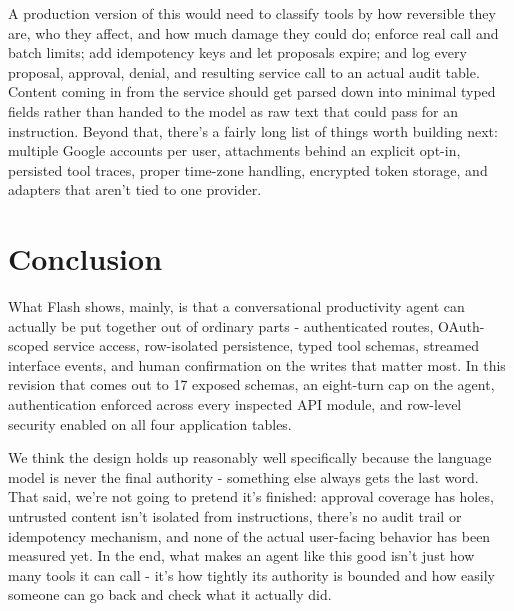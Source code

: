 \documentclass[conference]{IEEEtran}
\begin{document}
A production version of this would need to classify tools by how reversible they are, who they affect, and how much damage they could do; enforce real call and batch limits; add idempotency keys and let proposals expire; and log every proposal, approval, denial, and resulting service call to an actual audit table. Content coming in from the service should get parsed down into minimal typed fields rather than handed to the model as raw text that could pass for an instruction. Beyond that, there's a fairly long list of things worth building next: multiple Google accounts per user, attachments behind an explicit opt-in, persisted tool traces, proper time-zone handling, encrypted token storage, and adapters that aren't tied to one provider.

\balance
\section{Conclusion}

What Flash shows, mainly, is that a conversational productivity agent can actually be put together out of ordinary parts - authenticated routes, OAuth-scoped service access, row-isolated persistence, typed tool schemas, streamed interface events, and human confirmation on the writes that matter most. In this revision that comes out to 17 exposed schemas, an eight-turn cap on the agent, authentication enforced across every inspected API module, and row-level security enabled on all four application tables.

We think the design holds up reasonably well specifically because the language model is never the final authority - something else always gets the last word. That said, we're not going to pretend it's finished: approval coverage has holes, untrusted content isn't isolated from instructions, there's no audit trail or idempotency mechanism, and none of the actual user-facing behavior has been measured yet. In the end, what makes an agent like this good isn't just how many tools it can call - it's how tightly its authority is bounded and how easily someone can go back and check what it actually did.
\end{document}

